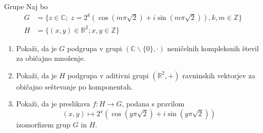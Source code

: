 \begin{frame}{Grupe}
	Naj bo 
	\begin{align*}
	G & = \{ z\in \mathbb{C};\; z = {2}^{k} (\cos(m\pi\sqrt{2})+ i \sin(m\pi\sqrt{2})), k, m \in \mathbb{Z}  \} \\
	H & = \{ (x,y) \in {\mathbb{R}}^{2}; x,y \in \mathbb{Z} \}
	\end{align*} 
	\begin{enumerate}
		\item
			Pokaži, da je $G$ podgrupa v grupi $ (\mathbb{C}\backslash \{0\}, \cdot)$
			neničelnih kompleksnih števil za običajno množenje.
		\item
			Pokaži, da je $H$ podgrupa v aditivni grupi $({\mathbb{R}}^{2}, +)$
			ravninskih vektorjev za običajno seštevanje po komponentah.
		\item
			Pokaži, da je preslikava $f:H\to G$, podana s pravilom
			$$
			(x,y) \mapsto {2}^{x}(\cos(y\pi\sqrt{2})+i\sin(y\pi\sqrt{2}))
			$$
			izomorfizem grup $G$ in $H$.
	\end{enumerate}
\end{frame}
